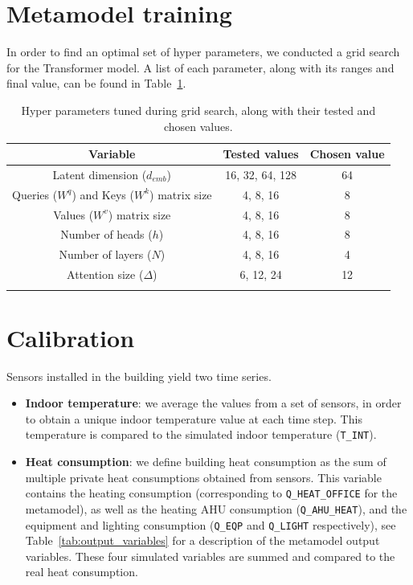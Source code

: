 \documentclass{article}
\begin{document}
\section{Metamodel training}
In order to find an optimal set of hyper parameters, we conducted a grid search for the Transformer model. A list of each parameter, along with its ranges and final value, can be found in Table~\ref{tab:grid_search}.

\begin{table}
    \centering
    \begin{tabular}{*3c}
        Variable                                     & Tested values   & Chosen value \\ \midrule
        Latent dimension ($d_{emb}$)                 & 16, 32, 64, 128 & 64           \\
        Queries ($W^q$) and Keys ($W^k$) matrix size & 4, 8, 16        & 8            \\
        Values ($W^v$) matrix size                   & 4, 8, 16        & 8            \\
        Number of heads ($h$)                        & 4, 8, 16        & 8            \\
        Number of layers ($N$)                       & 4, 8, 16        & 4            \\
        Attention size ($\Delta$)                    & 6, 12, 24       & 12           \\
        \bottomrule                                                                   \\
    \end{tabular}
    \caption{Hyper parameters tuned during grid search, along with their tested and chosen values.}
    \label{tab:grid_search}
\end{table}

\section{Calibration}
Sensors installed in the building yield two time series.
\begin{itemize}
    \item \textbf{Indoor temperature}: we average the values from a set of sensors, in order to obtain a unique indoor temperature value at each time step. This temperature is compared to the simulated indoor temperature (\texttt{T\_INT}).
    \item \textbf{Heat consumption}: we define building heat consumption as the sum of multiple private heat consumptions obtained from sensors. This variable contains the heating consumption (corresponding to \texttt{Q\_HEAT\_OFFICE} for the metamodel), as well as the heating AHU consumption (\texttt{Q\_AHU\_HEAT}), and the equipment and lighting consumption (\texttt{Q\_EQP} and \texttt{Q\_LIGHT} respectively), see Table~\ref{tab:output_variables} for a description of the metamodel output variables. These four simulated variables are summed and compared to the real heat consumption.
\end{itemize}


\end{document}
